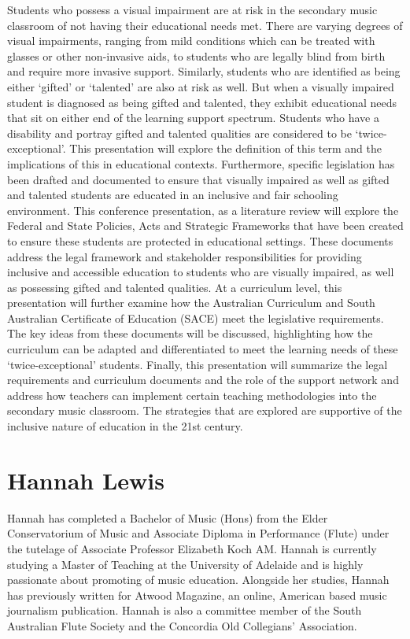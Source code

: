 \documentclass[twoside,14pt,a4paper,notitlepage]{memoir}
\begin{document}
Students who possess a visual impairment are at risk in the secondary music classroom of not having their educational needs met. There are varying degrees of visual impairments, ranging from mild conditions which can be treated with glasses or other non-invasive aids, to students who are legally blind from birth and require more invasive support. Similarly, students who are identified as being either ‘gifted’ or ‘talented’ are also at risk as well. But when a visually impaired student is diagnosed as being gifted and talented, they exhibit educational needs that sit on either end of the learning support spectrum. Students who have a disability and portray gifted and talented qualities are considered to be ‘twice-exceptional’. This presentation will explore the definition of this term and the implications of this in educational contexts.
Furthermore, specific legislation has been drafted and documented to ensure that visually impaired as well as gifted and talented students are educated in an inclusive and fair schooling environment. This conference presentation, as a literature review will explore the Federal and State Policies, Acts and Strategic Frameworks that have been created to ensure these students are protected in educational settings. These documents address the legal framework and stakeholder responsibilities for providing inclusive and accessible education to students who are visually impaired, as well as possessing gifted and talented qualities. At a curriculum level, this presentation will further examine how the Australian Curriculum and South Australian Certificate of Education (SACE) meet the legislative requirements. The key ideas from these documents will be discussed, highlighting how the curriculum can be adapted and differentiated to meet the learning needs of these ‘twice-exceptional’ students.
Finally, this presentation will summarize the legal requirements and curriculum documents and the role of the support network and address how teachers can implement certain teaching methodologies into the secondary music classroom. The strategies that are explored are supportive of the inclusive nature of education in the 21st century.

\section*{Hannah Lewis}

Hannah has completed a Bachelor of Music (Hons) from the Elder Conservatorium of Music and Associate Diploma in Performance (Flute) under the tutelage of Associate Professor Elizabeth Koch AM. Hannah is currently studying a Master of Teaching at the University of Adelaide and is highly passionate about promoting of music education. Alongside her studies, Hannah has previously written for Atwood Magazine, an online, American based music journalism publication. Hannah is also a committee member of the South Australian Flute Society and the Concordia Old Collegians’ Association.
\end{document}
